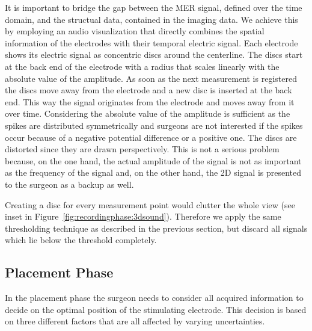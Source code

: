 \documentclass[review]{vgtc}                 %
\begin{document}
It is important to bridge the gap between the MER signal, defined over the time domain, and the structual data, contained in the imaging data. We achieve this by employing an audio visualization that directly combines the spatial information of the electrodes with their temporal electric signal. Each electrode shows its electric signal as concentric discs around the centerline. The discs start at the back end of the electrode with a radius that scales linearly with the absolute value of the amplitude. As soon as the next measurement is registered the discs move away from the electrode and a new disc is inserted at the back end. This way the signal originates from the electrode and moves away from it over time. Considering the absolute value of the amplitude is sufficient as the spikes are distributed symmetrically and surgeons are not interested if the spikes occur because of a negative potential difference or a positive one. The discs are distorted since they are drawn perspectively. This is not a serious problem because, on the one hand, the actual amplitude of the signal is not as important as the frequency of the signal and, on the other hand, the 2D signal is presented to the surgeon as a backup as well.

Creating a disc for every measurement point would clutter the whole view (see inset in Figure~\ref{fig:recordingphase:3dsound}). Therefore we apply the same thresholding technique as described in the previous section, but discard all signals which lie below the threshold completely.


\subsection{Placement Phase}\label{sec:overview:placement}
In the placement phase the surgeon needs to consider all acquired information to decide on the optimal position of the stimulating electrode. This decision is based on three different factors that are all affected by varying uncertainties.
\end{document}
